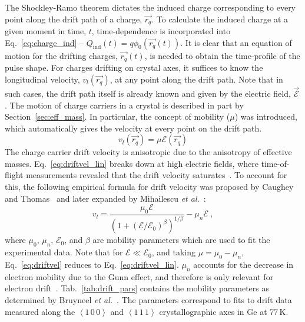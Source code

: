 The Shockley-Ramo theorem dictates the induced charge corresponding to every point along the drift path of a charge, $\vec{r_q}$. To calculate the induced charge at a given moment in time, $t$, time-dependence is incorporated into Eq.~\ref{eq:charge_ind} -- $Q_\text{ind}(t) = q\phi_0(\vec{r_q}(t))$. It is clear that an equation of motion for the drifting charges, $\vec{r_q}(t)$, is needed to obtain the time-profile of the pulse shape. For charges drifting on crystal axes, it suffices to know the longitudinal velocity, $v_l(\vec{r_q})$, at any point along the drift path. Note that in such cases, the drift path itself is already known and given by the electric field, $\vec{\mathcal{E}}$. The motion of charge carriers in a crystal is described in part by Section~\ref{sec:eff_mass}. In particular, the concept of mobility ($\mu$) was introduced, which automatically gives the velocity at every point on the drift path.
\begin{equation}
	v_l(\vec{r_q}) = \mu\mathcal{E}(\vec{r_q})
	\label{eq:driftvel_lin}
\end{equation}
The charge carrier drift velocity is anisotropic due to the anisotropy of effective masses. Eq.~\ref{eq:driftvel_lin} breaks down at high electric fields, where time-of-flight measurements revealed that the drift velocity saturates~\cite{driftvelSi1,driftvelSi2,driftvelGe}. To account for this, the following empirical formula for drift velocity was proposed by Caughey and Thomas~\cite{drift_parametrization} and later expanded by Mihailescu \textit{et al.}~\cite{Mihailescu2000}:
\begin{equation}
	v_l = \frac{\mu_0\mathcal{E}}{\left(1+(\mathcal{E}/\mathcal{E}_0)^\beta\right)^{1/\beta}} - \mu_n\mathcal{E}~,
	\label{eq:driftvel}
\end{equation}
where $\mu_0$, $\mu_n$, $\mathcal{E}_0$, and $\beta$ are mobility parameters which are used to fit the experimental data. Note that for $\mathcal{E} \ll \mathcal{E}_0$, and taking $\mu = \mu_0 - \mu_n$, Eq.~\ref{eq:driftvel} reduces to Eq.~\ref{eq:driftvel_lin}. $\mu_n$ accounts for the decrease in electron mobility due to the Gunn effect, and therefore is only relevant for electron drift~\cite{gunn_effect}. Tab.~\ref{tab:drift_pars} contains the mobility parameters as determined by Bruyneel \textit{et al.}~\cite{drift_pars}. The parameters correspond to fits to drift data measured along the $\left<1\,0\,0\right>$ and $\left<1\,1\,1\right>$ crystallographic axes in Ge at 77\,K.
